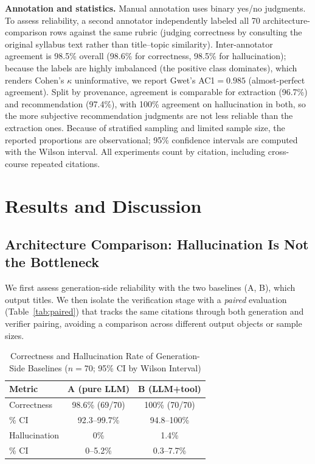 \documentclass[conference]{IEEEtran}
\begin{document}
\textbf{Annotation and statistics.} Manual annotation uses binary yes/no
judgments. To assess reliability, a second annotator independently labeled all
70 architecture-comparison rows against the same rubric (judging correctness by
consulting the original syllabus text rather than title--topic similarity).
Inter-annotator agreement is 98.5\% overall (98.6\% for correctness, 98.5\% for
hallucination); because the labels are highly imbalanced (the positive class
dominates), which renders Cohen's $\kappa$ uninformative, we report Gwet's
AC1${}=0.985$ (almost-perfect agreement). Split by provenance, agreement is
comparable for extraction (96.7\%) and recommendation (97.4\%), with 100\%
agreement on hallucination in both, so the more subjective recommendation
judgments are not less reliable than the extraction ones. Because of stratified
sampling and limited sample size, the reported proportions are observational;
95\% confidence
intervals are computed with the Wilson interval. All experiments count by
citation, including cross-course repeated citations.

\section{Results and Discussion}

\subsection{Architecture Comparison: Hallucination Is Not the Bottleneck}
We first assess generation-side reliability with the two baselines (A, B), which
output titles. We then isolate the verification stage with a \emph{paired}
evaluation (Table~\ref{tab:paired}) that tracks the same citations through both
generation and verifier pairing, avoiding a comparison across different output
objects or sample sizes.

\begin{table}[t]
\caption{Correctness and Hallucination Rate of Generation-Side Baselines
($n=70$; 95\% CI by Wilson Interval)}
\label{tab:baseline}
\centering
\small
\setlength{\tabcolsep}{4pt}
\begin{tabular}{lcc}
\toprule
Metric & A (pure LLM) & B (LLM+tool) \\
\midrule
Correctness & 98.6\% (69/70) & 100\% (70/70) \\
\quad 95\% CI & 92.3--99.7\% & 94.8--100\% \\
Hallucination & 0\% & 1.4\% \\
\quad 95\% CI & 0--5.2\% & 0.3--7.7\% \\
\bottomrule
\end{tabular}
\end{table}
\end{document}
